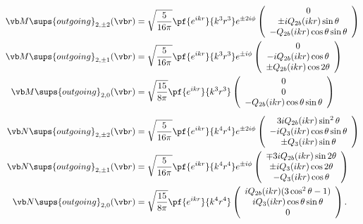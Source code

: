 \documentclass[letterpaper]{article}
\begin{document}
\begin{align*}
 \vb M\sups{outgoing}_{2,\pm 2}(\vb r)
  &=\sqrt\frac{5}{16\pi}\pf{e^{ikr}}{k^3 r^3} e^{\pm 2i\phi}
    \left(\begin{array}{c}
    0 				  \\
   \pm  iQ_{2b}(ikr)\sin\theta	  \\
    -Q_{2b}(ikr)\cos\theta\sin\theta
    \end{array}\right)
\\
 \vb M\sups{outgoing}_{2,\pm 1}(\vb r)
  &=\sqrt\frac{5}{16\pi}\pf{e^{ikr}}{k^3 r^3} e^{\pm i\phi}
    \left(\begin{array}{c}
    0                            \\
    -iQ_{2b}(ikr)\cos\theta  \\
    \pm Q_{2b}(ikr)\cos 2\theta
    \end{array}\right)
\\
 \vb M\sups{outgoing}_{2,0}(\vb r)
  &=\sqrt\frac{15}{8\pi}\pf{e^{ikr}}{k^3 r^3}
    \left(\begin{array}{c}
    0 \\ 
    0 \\ 
    -Q_{2b}(ikr)\cos \theta \sin\theta
    \end{array}\right)
\\[5pt]
 \vb N\sups{outgoing}_{2,\pm 2}(\vb r)
  &=\sqrt\frac{5}{16\pi}\pf{e^{ikr}}{k^4 r^4} e^{\pm 2i\phi}
    \left(\begin{array}{c}
   3iQ_{2b}(ikr) \sin^2 \theta                          \\
   -iQ_3(ikr) \cos\theta \sin\theta   \\
   \pm Q_3(ikr) \sin\theta 
    \end{array}\right)
\\
 \vb N\sups{outgoing}_{2,\pm 1}(\vb r)
  &=\sqrt\frac{5}{16\pi}\pf{e^{ikr}}{k^4 r^4} e^{\pm i\phi}
    \left(\begin{array}{c}
   \mp 3iQ_{2b}(ikr) \sin 2\theta               \\
   \pm iQ_3(ikr) \cos 2\theta  \\
   -Q_3(ikr) \cos\theta
    \end{array}\right)
\\
 \vb N\sups{outgoing}_{2,0}(\vb r)
  &=\sqrt\frac{15}{8\pi}\pf{e^{ikr}}{k^4 r^4}
    \left(\begin{array}{c}
   iQ_{2b}(ikr)(3\cos^2 \theta -1)                    \\
   iQ_3(ikr) \cos \theta \sin\theta \\
   0
    \end{array}\right).
\end{align*}
\end{document}
